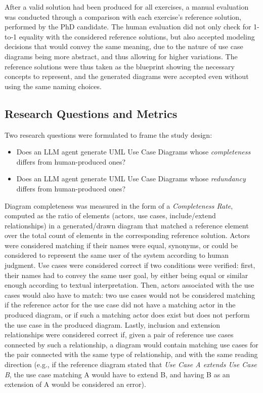 After a valid solution had been produced for all exercises, a manual evaluation was conducted through a comparison with each exercise's reference solution, performed by the PhD candidate. The human evaluation did not only check for 1-to-1 equality with the considered reference solutions, but also accepted modeling decisions that would convey the same meaning, due to the nature of use case diagrams being more abstract, and thus allowing for higher variations. The reference solutions were thus taken as the blueprint showing the necessary concepts to represent, and the generated diagrams were accepted even without using the same naming choices.

\subsection{Research Questions and Metrics}

Two research questions were formulated to frame the study design:

\begin{itemize}
  \item[\textbf{RQ1}] Does an LLM agent generate UML Use Case Diagrams whose \textit{completeness} differs from human-produced ones?
  \item[\textbf{RQ2}] Does an LLM agent generate UML Use Case Diagrams whose \textit{redundancy} differs from human-produced ones?
\end{itemize}

Diagram completeness was measured in the form of a \textit{Completeness Rate}, computed as the ratio of elements (actors, use cases, include/extend relationships) in a generated/drawn diagram that matched a reference element over the total count of elements in the corresponding reference solution. Actors were considered matching if their names were equal, synonyms, or could be considered to represent the same user of the system according to human judgment. Use cases were considered correct if two conditions were verified: first, their names had to convey the same user goal, by either being equal or similar enough according to textual interpretation. Then, actors associated with the use cases would also have to match: two use cases would not be considered matching if the reference actor for the use case did not have a matching actor in the produced diagram, or if such a matching actor does exist but does not perform the use case in the produced diagram. Lastly, inclusion and extension relationships were considered correct if, given a pair of reference use cases connected by such a relationship, a diagram would contain matching use cases for the pair connected with the same type of relationship, and with the same reading direction (e.g., if the reference diagram stated that \textit{Use Case A extends Use Case B}, the use case matching A would have to extend B, and having B as an extension of A would be considered an error).

